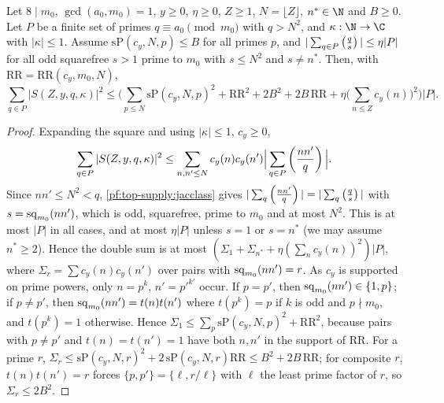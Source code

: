 \begin{lemma}\label{pf:top-supply:meansqabs}
Let $8\mid m_0$, $\gcd(a_0,m_0)=1$, $y\ge0$, $\eta\ge0$, $Z\ge1$, $N=\lfloor Z\rfloor$, $n^*\in\N$ and $B\ge0$. Let
$P$ be a finite set of primes $q\equiv a_0\pmod{m_0}$ with $q>N^2$, and $\kappa:\N\to\C$ with $|\kappa|\le1$. Assume
$\mathrm{sP}(c_y,N,p)\le B$ for all primes $p$, and $|\sum_{q\in P}\left(\frac{q}{s}\right)|\le\eta|P|$ for all odd squarefree
$s>1$ prime to $m_0$ with $s\le N^2$ and $s\ne n^*$. Then, with $\mathrm{RR}=\mathrm{RR}(c_y,m_0,N)$,
\[
\sum_{q\in P}|S(Z,y,q,\kappa)|^2\le\Big(\sum_{p\le N}\mathrm{sP}(c_y,N,p)^2+\mathrm{RR}^2+2B^2+2B\,\mathrm{RR}
+\eta\Big(\sum_{n\le Z}c_y(n)\Big)^2\Big)|P|.
\]
\end{lemma}

\begin{proof}
Expanding the square and using $|\kappa|\le1$, $c_y\ge0$,
\[
\sum_{q\in P}|S(Z,y,q,\kappa)|^2\le\sum_{n,n'\le N}c_y(n)c_y(n')\Big|\sum_{q\in P}\left(\frac{nn'}{q}\right)\Big|.
\]
Since $nn'\le N^2<q$, \cref{pf:top-supply:jacclass} gives
$|\sum_q\left(\frac{nn'}{q}\right)|=|\sum_q\left(\frac{q}{s}\right)|$ with $s=\operatorname{sq}_{m_0}(nn')$, which is odd, squarefree, prime
to $m_0$ and at most $N^2$. This is at most $|P|$ in all cases, and at most $\eta|P|$ unless $s=1$ or $s=n^*$
(we may assume $n^*\ge2$). Hence the double sum is at most $(\Sigma_1+\Sigma_{n^*}+\eta(\sum_nc_y(n))^2)|P|$, where
$\Sigma_r=\sum c_y(n)c_y(n')$ over pairs with $\operatorname{sq}_{m_0}(nn')=r$. As $c_y$ is supported on prime powers,
only $n=p^k$, $n'=p'^{k'}$ occur. If $p=p'$, then $\operatorname{sq}_{m_0}(nn')\in\{1,p\}$; if $p\ne p'$, then
$\operatorname{sq}_{m_0}(nn')=t(n)t(n')$ where $t(p^k)=p$ if $k$ is odd and $p\nmid m_0$, and $t(p^k)=1$ otherwise. Hence
$\Sigma_1\le\sum_p\mathrm{sP}(c_y,N,p)^2+\mathrm{RR}^2$, because pairs with $p\ne p'$ and $t(n)=t(n')=1$ have both $n,n'$ in
the support of $\mathrm{RR}$. For a prime $r$, $\Sigma_r\le\mathrm{sP}(c_y,N,r)^2+2\,\mathrm{sP}(c_y,N,r)\mathrm{RR}\le
B^2+2B\,\mathrm{RR}$; for composite $r$, $t(n)t(n')=r$ forces $\{p,p'\}=\{\ell,r/\ell\}$ with $\ell$ the least prime factor
of $r$, so $\Sigma_r\le2B^2$.
\end{proof}

